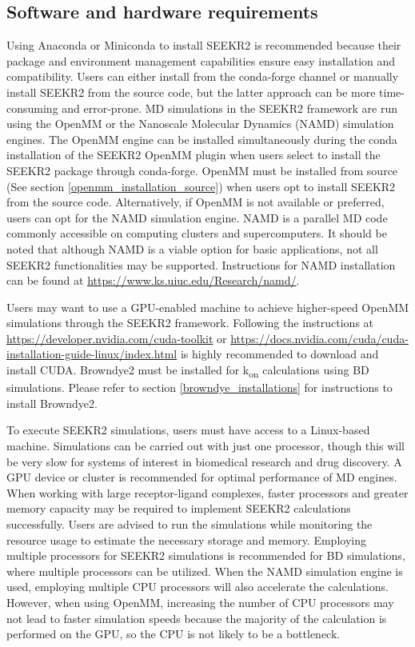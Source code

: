 \documentclass[9pt,training,pubversion]{livecoms}
\newcommand{\namdlink}
{\url{https://www.ks.uiuc.edu/Research/namd/}}
\newcommand{\cudatutoriallinka}
{\url{https://developer.nvidia.com/cuda-toolkit}}
\newcommand{\cudatutoriallinkb}
{\url{https://docs.nvidia.com/cuda/cuda-installation-guide-linux/index.html}}
\begin{document}
\subsection{Software and hardware requirements}
\vspace{2mm}
\noindent Using Anaconda or Miniconda to install SEEKR2 is recommended because their package and environment management capabilities ensure easy installation and compatibility. Users can either install from the conda-forge channel or manually install SEEKR2 from the source code, but the latter approach can be more time-consuming and error-prone. MD simulations in the SEEKR2 framework are run using the OpenMM or the  Nanoscale Molecular Dynamics (NAMD) simulation engines. The OpenMM engine can be installed simultaneously during the conda installation of the SEEKR2 OpenMM plugin when users select to install the SEEKR2 package through conda-forge. OpenMM must be installed from source (See section \ref{openmm_installation_source}) when users opt to install SEEKR2 from the source code. Alternatively, if OpenMM is not available or preferred, users can opt for the NAMD simulation engine. NAMD is a parallel MD code commonly accessible on computing clusters and supercomputers. It should be noted that although NAMD is a viable option for basic applications, not all SEEKR2 functionalities may be supported. Instructions for NAMD installation can be found at \namdlink. \par

\noindent Users may want to use a GPU-enabled machine to achieve higher-speed OpenMM simulations through the SEEKR2 framework. Following the instructions at \cudatutoriallinka {} or \cudatutoriallinkb {} is highly recommended to download and install CUDA. Browndye2 must be installed for k\textsubscript{on} calculations using BD simulations. Please refer to section \ref{browndye_installations} for instructions to install Browndye2. \par

\noindent To execute SEEKR2 simulations, users must have access to a Linux-based machine. Simulations can be carried out with just one processor, though this will be very slow for systems of interest in biomedical research and drug discovery. A GPU device or cluster is recommended for optimal performance of MD engines. When working with large receptor-ligand complexes, faster processors and greater memory capacity may be required to implement SEEKR2 calculations successfully. Users are advised to run the simulations while monitoring the resource usage to estimate the necessary storage and memory. Employing multiple processors for SEEKR2 simulations is recommended for BD simulations, where multiple processors can be utilized. When the NAMD simulation engine is used, employing multiple CPU processors will also accelerate the calculations. However, when using OpenMM, increasing the number of CPU processors may not lead to faster simulation speeds because the majority of the calculation is performed on the GPU, so the CPU is not likely to be a bottleneck.\par
\end{document}
